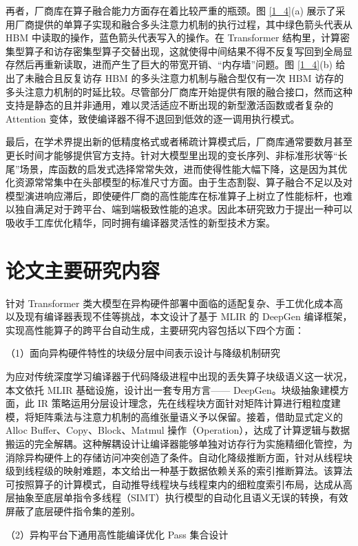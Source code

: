 再者，厂商库在算子融合能力方面存在着比较严重的瓶颈。图 \ref{1_4}(a) 展示了采用厂商提供的单算子实现和融合多头注意力机制的执行过程，其中绿色箭头代表从 HBM 中读取的操作，蓝色箭头代表写入的操作。在 Transformer 结构里，计算密集型算子和访存密集型算子交替出现，这就使得中间结果不得不反复写回到全局显存然后再重新读取，进而产生了巨大的带宽开销、“内存墙”问题。图 \ref{1_4}(b) 给出了未融合且反复访存 HBM 的多头注意力机制与融合型仅有一次 HBM 访存的多头注意力机制的时延比较。尽管部分厂商库开始提供有限的融合接口，然而这种支持是静态的且并非通用，难以灵活适应不断出现的新型激活函数\cite{fernandez2024telu}或者复杂的 Attention 变体\cite{lin2022survey}，致使编译器不得不退回到低效的逐一调用执行模式。

最后，在学术界提出新的低精度格式或者稀疏计算模式后，厂商库通常要数月甚至更长时间才能够提供官方支持。针对大模型里出现的变长序列、非标准形状等“长尾”场景，库函数的启发式选择常常失效，进而使得性能大幅下降，这是因为其优化资源常常集中在头部模型的标准尺寸方面。由于生态割裂、算子融合不足以及对模型演进响应滞后，即使硬件厂商的高性能库在标准算子上树立了性能标杆，也难以独自满足对于跨平台、端到端极致性能的追求。因此本研究致力于提出一种可以吸收手工库优化精华，同时拥有编译器灵活性的新型技术方案。

\section{论文主要研究内容}
针对 Transformer 类大模型在异构硬件部署中面临的适配复杂、手工优化成本高以及现有编译器表现不佳等挑战，本文设计了基于 MLIR 的 DeepGen 编译框架，实现高性能算子的跨平台自动生成，主要研究内容包括以下四个方面：

（1）面向异构硬件特性的块级分层中间表示设计与降级机制研究

为应对传统深度学习编译器于代码降级进程中出现的丢失算子块级语义这一状况，本文依托 MLIR 基础设施，设计出一套专用方言—— DeepGen。块级抽象建模方面，此 IR 策略运用分层设计理念，先在线程块方面针对矩阵计算进行粗粒度建模，将矩阵乘法与注意力机制的高维张量语义予以保留。接着，借助显式定义的 Alloc Buffer、Copy、Block、Matmul 操作（Operation），达成了计算逻辑与数据搬运的完全解耦。这种解耦设计让编译器能够单独对访存行为实施精细化管控，为消除异构硬件上的存储访问冲突创造了条件。自动化降级推断方面，针对从线程块级到线程级的映射难题，本文给出一种基于数据依赖关系的索引推断算法。该算法可按照算子的计算模式，自动推导线程块与线程束内的细粒度索引布局，达成从高层抽象至底层单指令多线程（SIMT）执行模型的自动化且语义无误的转换，有效屏蔽了底层硬件指令集的差别。

（2）异构平台下通用高性能编译优化 Pass 集合设计

